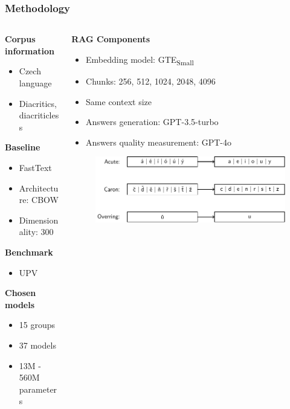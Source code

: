 \documentclass{beamer}
\begin{document}
\begin{frame}
  \frametitle{Methodology}
  \begin{columns}[onlytextwidth,T]
    \begin{column}{0.4\textwidth}
      \textcolor{cvut_navy}{\textbf{Corpus information}}
      \begin{itemize}
        \item Czech language
        \item Diacritics, diacriticless
      \end{itemize}
      \textcolor{cvut_navy}{\textbf{Baseline}}
      \begin{itemize}
        \item FastText
        \item Architecture: CBOW
        \item Dimensionality: 300
      \end{itemize}
      \textcolor{cvut_navy}{\textbf{Benchmark}}
      \begin{itemize}
        \item UPV
      \end{itemize}
      \textcolor{cvut_navy}{\textbf{Chosen models}}
      \begin{itemize}
        \item 15 groups
        \item 37 models
        \item 13M - 560M parameters
      \end{itemize}
    \end{column}
    \begin{column}{0.75\textwidth}
      \textcolor{cvut_navy}{\textbf{RAG Components}}
      \begin{itemize}
        \item Embedding model: GTE\textsubscript{Small}
        \item Chunks: 256, 512, 1024, 2048, 4096
        \item Same context size
        \item Answers generation: GPT-3.5-turbo
        \item Answers quality measurement: GPT-4o
      \end{itemize}
      \begin{figure}
        \raggedright
        \includegraphics[scale=0.6]{src/fig/pdfs/tikz/diacritics_diacriticless.pdf}
      \end{figure}     
    \end{column}
  \end{columns}
    
  
\end{frame}
\end{document}
